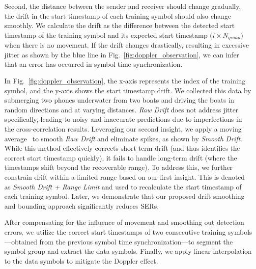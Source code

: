 Second, the distance between the sender and receiver should change gradually,
\ie the drift in the start timestamp of each training symbol should also
change smoothly. We calculate the drift as the difference between the
detected start timestamp of the training symbol and its expected start timestamp
($i \times N_{group}$) when there is no movement. If the drift changes
drastically, resulting in excessive jitter as shown by the blue line
in Fig.~\ref{fig:doppler_observation}, we can infer that
an error has occurred in symbol time synchronization.

In Fig.~\ref{fig:doppler_observation}, the x-axis represents the index of the training symbol, and the y-axis shows the start timestamp drift. We collected this data by submerging two phones underwater from two boats and driving the boats in random directions and at varying distances.
\textit{Raw Drift} does not address jitter specifically, leading to noisy and inaccurate predictions due to imperfections in the cross-correlation results.
Leveraging our second insight, we apply a moving average~\cite{moving_average} to smooth \textit{Raw Drift} and eliminate spikes, as shown by \textit{Smooth Drift}. While this method effectively corrects short-term drift (and thus identifies the correct start timestamp quickly), it fails to handle long-term drift (where the timestamps shift beyond the recoverable range). To address this, we further constrain drift within a limited range based on our first insight. This is denoted as \textit{Smooth Drift + Range Limit} and used to
recalculate the start timestamp of each training symbol. Later, we demonstrate that
our proposed drift smoothing and bounding approach significantly reduces
SERs.

After compensating for the influence of movement and smoothing out detection errors, we utilize the correct start timestamps of two consecutive training symbols---obtained from the previous symbol time synchronization---to segment the symbol group and extract the data symbols. Finally, we apply linear interpolation to the data symbols to mitigate the Doppler effect.






















